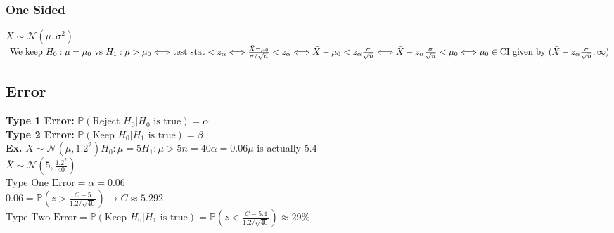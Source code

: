 \documentclass{article}
\begin{document}
\subsubsection{One Sided}
$X\sim\mathcal{N}(\mu,\sigma^2)$\\
$\text{ We keep } H_0: \mu=\mu_0\text{ vs }H_1:\mu>\mu_0\Longleftrightarrow\text{test stat}<z_\alpha\Longleftrightarrow\frac{\bar X-\mu_0}{\sigma/\sqrt{n}}<z_\alpha\\
\Longleftrightarrow\bar X-\mu_0<z_\alpha\frac{\sigma}{\sqrt{n}}\Longleftrightarrow\bar X-z_\alpha\frac{\sigma}{\sqrt{n}}<\mu_0\Longleftrightarrow\mu_0\in\text{CI given by }(\bar X-z_\alpha\frac{\sigma}{\sqrt{n}},\infty)$
\subsection{Error}
\label{sec:herror}
\textbf{Type 1 Error:} $\mathbb{P}(\text{Reject }H_0\vert H_0\text{ is true})=\alpha$\\
\textbf{Type 2 Error:} $\mathbb{P}(\text{Keep }H_0\vert H_1\text{ is true})=\beta$\\
\textbf{Ex.} $X\sim\mathcal{N}(\mu,1.2^2)$\hspace*{0.25in}$H_0:\mu=5$\hspace*{0.25in}$H_1:\mu>5$\hspace*{0.25in}$n=40$\hspace*{0.25in}$\alpha=0.06$\hspace*{0.25in}$\mu$ is actually $5.4$\\
$\bar X\sim\mathcal{N}(5,\frac{1.2^2}{40})$\\
$\text{Type One Error}=\alpha=0.06$\\
$0.06=\mathbb{P}(z>\frac{C-5}{1.2/\sqrt{40}})\rightarrow C\approx 5.292$\\
$\text{Type Two Error}=\mathbb{P}(\text{Keep }H_0\vert H_1\text{ is true})=\mathbb{P}(z<\frac{C-5.4}{1.2/\sqrt{40}})\approx 29\%$
\newpage
\end{document}

